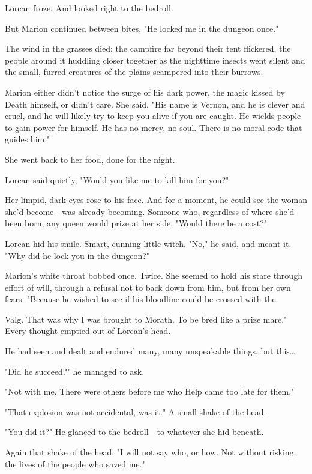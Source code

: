 Lorcan froze. And looked right to the bedroll.

But Marion continued between bites, "He  locked me in the dungeon once."

The wind in the grasses died; the campfire far beyond their tent flickered, the people around it huddling closer together as the nighttime insects went silent and the small, furred creatures of the plains scampered into their burrows.

Marion either didn't notice the surge of his dark power, the magic kissed by Death himself, or didn't care. She said, "His name is Vernon, and he is clever and cruel, and he will likely try to keep you alive if you are caught. He wields people to gain power for himself. He has no mercy, no soul. There is no moral code that guides him."

She went back to her food, done for the night.

Lorcan said quietly, "Would you like me to kill him for you?"

Her limpid, dark eyes rose to his face. And for a moment, he could see the woman she'd become---was already becoming. Someone who, regardless of where she'd been born, any queen would prize at her side. "Would there be a cost?"

Lorcan hid his smile. Smart, cunning little witch. "No," he said, and meant it. "Why did he lock you in the dungeon?"

Marion's white throat bobbed once. Twice. She seemed to hold his stare through effort of will, through a refusal not to back down from him, but from her own fears. "Because he wished to see if his bloodline could be crossed with the

Valg. That was why I was brought to Morath. To be bred like a prize mare." Every thought emptied out of Lorcan's head.

He had seen and dealt and endured many, many unspeakable things, but this\ldots{}

"Did he succeed?" he managed to ask.

"Not with me. There were others before me who  Help came too late for them."

"That explosion was not accidental, was it." A small shake of the head.

"You did it?" He glanced to the bedroll---to whatever she hid beneath.

Again that shake of the head. "I will not say who, or how. Not without risking the lives of the people who saved me."

